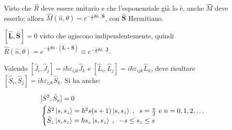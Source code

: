 \documentclass[10pt, a4paper]{scrartcl} %
\numberwithin{equation}{subsection}
\theoremstyle{style2}
\theoremstyle{style1}
\newenvironment{boxenv}[1][]{
    \begin{eqbox}[#1]
    }{
   \end{eqbox}
}
\begin{document}
Visto che $\hat{R}$ deve essere unitario e che l'esponenziale gi\`a lo \`e, anche $\hat{M}$ deve esserlo; allora $\hat{M}(\hat{n},\theta ) = e^{- \frac{i}{\hbar } \theta  \hat{n} \cdot \hat{\mathbf{S} } } $, con $\hat{\mathbf{S} }$ Hermitiano.

$[\hat{\mathbf{L} }, \hat{\mathbf{S} }]= 0$ visto che agiscono indipendentemente, quindi $\hat{R}(\hat{n},\theta ) = e^{ - \frac{i}{\hbar } \theta  \hat{n}\cdot (\hat{\mathbf{L} }+ \hat{\mathbf{S} })}\equiv e^{ - \frac{i}{\hbar } \theta  \hat{n}\cdot \hat{\mathbf{J} }}$.

Valendo $[\hat{J}_i, \hat{J}_j] = i\hbar \varepsilon _{ijk} \hat{J}_k$ e $[\hat{L}_i, \hat{L}_j] = i \hbar \varepsilon _{ijk} \hat{L}_k$, deve risultare $[\hat{S}_i , \hat{S}_j ] = i\hbar \varepsilon _{ijk} \hat{S}_k$. Si ha anche:
\begin{boxenv}[]
\begin{equation}
\begin{split}
	&[\hat{S}^2 , \hat{S}_a] = 0\\
	&\begin{cases}
		\hat{S}^2 \ket{s ,s_z} = \hbar ^2 s(s+1) \ket{s, s_z}\hspace{.1cm} , \hspace{.2cm} s = \frac{n}{2} \text{ e } n = 0,1,2,\ldots\\
		\hat{S}_z \ket{s,s_z} = \hbar s_z \ket{s,s_z} \hspace{.1cm} , \hspace{.2cm} -s\le s_z \le s
	\end{cases}
\end{split}
\end{equation}
\end{boxenv}
\end{document}
